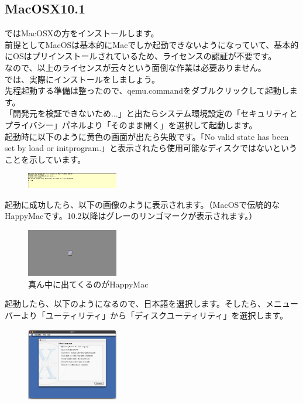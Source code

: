 \documentclass[b5paper,9pt,platex,dvipdfmx]{jsarticle}
\begin{document}
\begin{multicols*}{3}
\subsection{MacOSX10.1}
ではMacOSXの方をインストールします。\\
前提としてMacOSは基本的にMacでしか起動できないようになっていて、基本的にOSはプリインストールされているため、ライセンスの認証が不要です。\\
なので、以上のライセンスが云々という面倒な作業は必要ありません。\\
では、実際にインストールをしましょう。\\
先程起動する準備は整ったので、qemu.commandをダブルクリックして起動します。\\
「開発元を検証できないため...」と出たらシステム環境設定の「セキュリティとプライバシー」パネルより「そのまま開く」を選択して起動します。\\
起動時に以下のように黄色の画面が出たら失敗です。「No valid  state has been set by load or init\-program.」と表示されたら使用可能なディスクではないということを示しています。\\
\begin{figure}[H]
  \centering
  \includegraphics[width=4cm]{4.png}
  \caption{}
\end{figure}
起動に成功したら、以下の画像のように表示されます。（MacOSで伝統的なHappyMacです。10.2以降はグレーのリンゴマークが表示されます。）\\
\begin{figure}[H]
  \centering
  \includegraphics[width=4cm]{5.png}
  \caption{真ん中に出てくるのがHappyMac}
\end{figure}
起動したら、以下のようになるので、日本語を選択します。そしたら、メニューバーより「ユーティリティ」から「ディスクユーティリティ」を選択します。\\
\begin{figure}[H]
  \centering
  \includegraphics[width=4cm]{osx-cd.png}

\end{figure}
\end{multicols*}
\end{document}
